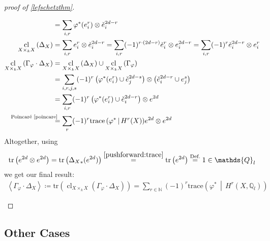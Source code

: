 \documentclass[english]{scrartcl}
\theoremstyle{definition}
\theoremstyle{remark}
\newcommand*{\N}{\mathds{N}}
\newcommand*{\Z}{\mathds{Z}}
\newcommand*{\Q}{\mathds{Q}}
\newcommand*{\Zl}{\Z_l} %
\newcommand*{\Ql}{\Q_l} %
\newcommand*{\Tr}{\text{tr}} %
\newcommand*{\tr}[1]{\Tr\left(#1\right)} %
\newcommand*{\intProd}[2]{{#1\cdot#2}} %
\newcommand*{\intNum}[1]{{\left\langle{#1}\right\rangle}} %
\newcommand*{\Graph}[1]{{\Gamma_{#1}}} %
\newcommand*{\Diag}[1]{{\Delta_{#1}}} %
\newcommand*{\trace}[2]{{\text{trace}\left(#1 \,\middle|\, #2 \right)}} %
\DeclareMathOperator{\CL}{cl} %
\newcommand*{\cl}[2]{{\CL_{#1}\left(#2\right)}} %
\renewcommand*{\phi}{\varphi}
\newcommand*{\Poincare}{{\text{Poincaré \ref{poincare}}}}
\begin{document}
\begin{proof}[proof of \autoref{lefschetzthm}]
\begin{enumerate}[label={Step \arabic*.}]
\begin{align*}
      &= \sum_{i,r} \phi^*(e_i^r)\otimes \check e_i^{2d-r}\\
      \cl{X\times_k X}{\Diag{X}}
      &= \sum_{i,r} e_i^r\otimes \check e_i^{2d-r} =
        \sum_{i,r} (-1)^{r\cdot (2d-r)}\check e_i^r\otimes e_i^{2d-r} =
        \sum_{i,r} (-1)^{r}\check e_i^{2d-r}\otimes e_i^r\\
      \cl{X\times_k X}{\intProd{\Graph{\phi}}{\Diag{X}}}
      &= \cl{X\times_k X}{\Diag{X}} \cup \cl{X\times_k X}{\Graph{\phi}}\\
      &= \sum_{i,r,j,s} (-1)^{r}
        \left(\phi^*(e_i^r)\cup \check e_j^{2d-s}\right)
        \otimes \left(\check e_i^{2d-r}\cup e_j^s\right)\\
      &= \sum_{i,r} (-1)^{r}
        \left(\phi^*(e_i^r)\cup \check e_i^{2d-r}\right)
        \otimes e^{2d}\\
      &\overset{\mathllap{\Poincare}}=
        \sum_{r} (-1)^r \trace{\phi^*}{H^r(X)} e^{2d} \otimes e^{2d}
    \end{align*}
    Altogether, using
    \begin{align*}
      \tr{e^{2d} \otimes e^{2d}}
      = \tr{\Diag{X}_*(e^{2d})}
      \overset{\eqref{pushforward:trace}}= \tr{e^{2d}}
      \overset{\text{Def.}}= 1\in\Ql
    \end{align*}
    we get our final result:
    \begin{gather*}
      \intNum{\intProd{\Graph\phi}{\Diag X}} \coloneqq
      \tr{\cl{X\times_kX}{\intProd{\Graph\phi}{\Diag X}}}
      = \sum_{r\in\N} (-1)^r \trace{\phi^*}{H^r(X,\Ql)}
    \end{gather*}
  \end{enumerate}
\end{proof}

\subsection{Other Cases}

\nocite{*}
\printbibliography
\end{document}
